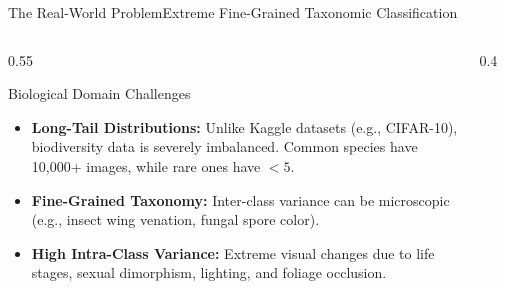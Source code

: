 \begin{frame}{The Real-World Problem}{Extreme Fine-Grained Taxonomic Classification}
    \begin{columns}[T]
        \begin{column}{0.55\textwidth}
            \begin{block}{Biological Domain Challenges}
                \begin{itemize}
                    \item \textbf{Long-Tail Distributions:} Unlike Kaggle datasets (e.g., CIFAR-10), biodiversity data is severely imbalanced. Common species have 10,000+ images, while rare ones have $<5$.
                    \item \textbf{Fine-Grained Taxonomy:} Inter-class variance can be microscopic (e.g., insect wing venation, fungal spore color).
                    \item \textbf{High Intra-Class Variance:} Extreme visual changes due to life stages, sexual dimorphism, lighting, and foliage occlusion.
                \end{itemize}
            \end{block}
        \end{column}
        \begin{column}{0.4\textwidth}
            \begin{figure}
                \centering
            \end{figure}
        \end{column}
    \end{columns}


\end{frame}
